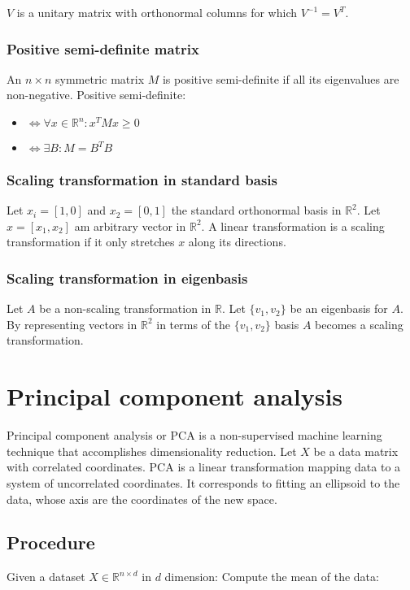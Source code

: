 			$V$ is a unitary matrix with orthonormal columns for which $V^{-1}=V^T$.

		\subsubsection{Positive semi-definite matrix}
		An $n\times n$ symmetric matrix $M$ is positive semi-definite if all its eigenvalues are non-negative.
		Positive semi-definite:
		\begin{multicols}{2}
			\begin{itemize}
				\item $\Leftrightarrow\forall x\in\mathbb{R}^n: x^TMx\ge 0$
				\item $\Leftrightarrow\exists B: M=B^TB$
			\end{itemize}
		\end{multicols}

		\subsubsection{Scaling transformation in standard basis}
		Let $x_i = [1,0]$ and $x_2 = [0,1]$ the standard orthonormal basis in $\mathbb{R}^2$.
		Let $x = [x_1, x_2]$ am arbitrary vector in $\mathbb{R}^2$.
		A linear transformation is a scaling transformation if it only stretches $x$ along its directions.

		\subsubsection{Scaling transformation in eigenbasis}
		Let $A$ be a non-scaling transformation in $\mathbb{R}$.
		Let $\{v_1, v_2\}$ be an eigenbasis for $A$.
		By representing vectors in $\mathbb{R}^2$ in terms of the $\{v_1, v_2\}$ basis $A$ becomes a scaling transformation.

\section{Principal component analysis}
Principal component analysis or PCA is a non-supervised machine learning technique that accomplishes dimensionality reduction.
Let $X$ be a data matrix with correlated coordinates.
PCA is a linear transformation mapping data to a system of uncorrelated coordinates.
It corresponds to fitting an ellipsoid to the data, whose axis are the coordinates of the new space.

	\subsection{Procedure}
	Given a dataset $X\in\mathbb{R}^{n\times d}$ in $d$ dimension:
	Compute the mean of the data:

